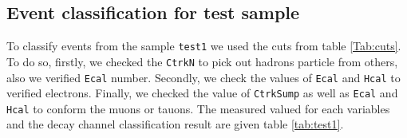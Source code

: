 \subsection{Event classification for test sample}

	
To classify events from the sample \verb|test1| we used the cuts from table \ref{Tab:cuts}. To do so, firstly, we checked the \verb|CtrkN| to pick out hadrons particle from others, also we verified \verb|Ecal| number. Secondly, we check the values of \verb|Ecal| and \verb|Hcal| to verified electrons. Finally, we checked the value of \verb|CtrkSump| as well as \verb|Ecal| and \verb|Hcal| to conform the muons or tauons. The measured valued for each variables and the decay channel classification result are given table \ref{tab:test1}.

